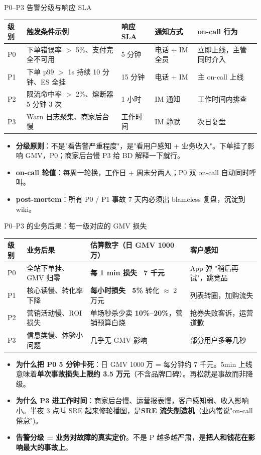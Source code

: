 \documentclass[aspectratio=169,11pt]{beamer}
\begin{document}
\begin{frame}[shrink]{P0--P3 告警分级与响应 SLA}
\scriptsize
\begin{tabular}{@{}lllll@{}}
\toprule
级别 & 触发条件示例 & 响应 SLA & 通知方式 & on-call 行为 \\
\midrule
P0 & 下单错误率 $>$ 5\%、支付完全不可用 & 5 分钟 & 电话 + IM 全员 & 立即上线，主管同时介入 \\
P1 & 下单 p99 $>$ 1s 持续 10 分钟、ES 全挂 & 15 分钟 & 电话 + IM & 主 on-call 上线 \\
P2 & 限流命中率 $>$ 2\%、熔断器 5 分钟 3 次 & 1 小时 & IM 通知 & 工作时间内排查 \\
P3 & Warn 日志聚集、商家后台慢 & 工作时间 & IM 静默 & 次日复盘 \\
\bottomrule
\end{tabular}

\medskip
\begin{itemize}\setlength{\itemsep}{1pt}
  \item \textbf{分级原则}：不是"看告警严重程度"，是"看用户感知 + 业务收入"。下单挂了影响 GMV，P0；商家后台慢 P3 给 BD 解释一下就行。
  \item \textbf{on-call 轮值}：每周一轮换，工作日 + 周末分两人；P0 双 on-call 自动同时呼叫。
  \item \textbf{post-mortem}：所有 P0 / P1 事故 7 天内必须出 blameless 复盘，沉淀到 wiki。
\end{itemize}

\end{frame}

\begin{frame}[shrink]{P0--P3 的业务后果：每一级对应的 GMV 损失}
\scriptsize
\begin{tabular}{@{}llll@{}}
\toprule
级别 & 业务后果 & 估算数字（日 GMV 1000 万） & 客户感知 \\
\midrule
P0 & 全站下单挂、GMV 归零 & \textbf{每 1 min 损失 ~7 千元} & App 弹 "稍后再试"，跳竞品 \\
P1 & 核心读慢、转化率下降 & \textbf{每小时损失 ~5\%} 转化 $\approx$ 2 万元 & 列表转圈，加购流失 \\
P2 & 营销活动慢、ROI 损失 & 单场秒杀少卖 \textbf{10\%--20\%}，营销预算白烧 & 抢券失败客诉，运营道歉 \\
P3 & 信息类慢、体验小问题 & 几乎无 GMV 影响 & 部分用户多等几秒 \\
\bottomrule
\end{tabular}
\vspace{2mm}
\begin{itemize}
  \item \textbf{为什么把 P0 5 分钟卡死}：日 GMV 1000 万 = 每分钟约 7 千元。5min 上线意味着\textbf{单次事故损失上限约 3.5 万元}（不含品牌口碑）。再松就是事故而非降级。
  \item \textbf{为什么 P3 进工作时间}：商家后台慢、运营报表慢，客户感知弱、收入影响小。半夜 3 点叫 SRE 起来修轮播图，是\textbf{SRE 流失制造机}（业内常说"on-call 倦怠")。
  \item \textbf{告警分级 = 业务对故障的真实定价}。不是 P 越多越严肃，是\textbf{把人和钱花在影响最大的事故上}。
\end{itemize}
\end{frame}
\end{document}

